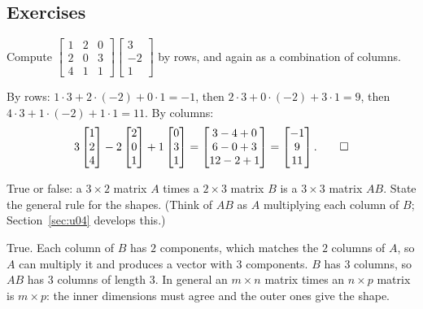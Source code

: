 \subsection{Exercises}

\begin{exercise}\label{ex:u01-multiply}
Compute $\begin{bmatrix} 1 & 2 & 0\\ 2 & 0 & 3\\ 4 & 1 & 1\end{bmatrix}
\begin{bmatrix} 3\\ -2\\ 1\end{bmatrix}$ by rows, and again as a combination of columns.
\end{exercise}
\begin{solution}
By rows: $1\cdot3+2\cdot(-2)+0\cdot1=-1$, then $2\cdot3+0\cdot(-2)+3\cdot1=9$, then
$4\cdot3+1\cdot(-2)+1\cdot1=11$. By columns:
\[
  3\begin{bmatrix} 1\\ 2\\ 4\end{bmatrix} - 2\begin{bmatrix} 2\\ 0\\ 1\end{bmatrix}
  + 1\begin{bmatrix} 0\\ 3\\ 1\end{bmatrix}
  = \begin{bmatrix} 3-4+0\\ 6-0+3\\ 12-2+1\end{bmatrix}
  = \begin{bmatrix} -1\\ 9\\ 11\end{bmatrix}. \qedhere
\]
\end{solution}

\begin{exercise}\label{ex:u01-shapes}
True or false: a $3\times2$ matrix $A$ times a $2\times3$ matrix $B$ is a $3\times3$ matrix
$AB$. State the general rule for the shapes. (Think of $AB$ as $A$ multiplying each column
of $B$; Section~\ref{sec:u04} develops this.)
\end{exercise}
\begin{solution}
True. Each column of $B$ has $2$ components, which matches the $2$ columns of $A$, so $A$
can multiply it and produces a vector with $3$ components. $B$ has $3$ columns, so $AB$ has
$3$ columns of length $3$. In general an $m\times n$ matrix times an $n\times p$ matrix is
$m\times p$: the inner dimensions must agree and the outer ones give the shape.
\end{solution}

